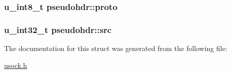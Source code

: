 \hypertarget{structpseudohdr_52550c6d13a3557d8d3a947d83f362f6}{
\subsubsection[{proto}]{\setlength{\rightskip}{0pt plus 5cm}u\_\-int8\_\-t {\bf pseudohdr::proto}}}
\label{structpseudohdr_52550c6d13a3557d8d3a947d83f362f6}


\hypertarget{structpseudohdr_c5ae2d59641e771ad3b48a6c29158a87}{
\subsubsection[{src}]{\setlength{\rightskip}{0pt plus 5cm}u\_\-int32\_\-t {\bf pseudohdr::src}}}
\label{structpseudohdr_c5ae2d59641e771ad3b48a6c29158a87}




The documentation for this struct was generated from the following file:\begin{CompactItemize}
\item 
\hyperlink{usock_8h}{usock.h}\end{CompactItemize}
